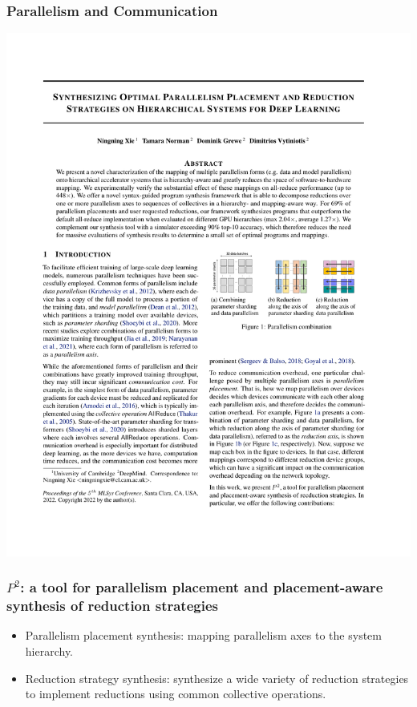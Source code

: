 \documentclass[12pt,aspectratio=169]{beamer}
\begin{document}
    \begin{frame}
        \frametitle{Parallelism and Communication}

        \centering
        \includegraphics[page=2,trim=1.92cm 20cm 2.2cm 2.2cm,clip,scale=0.8]{p2.pdf}
    \end{frame}

    \begin{frame}
        \frametitle{$P^2$: a tool for parallelism placement and placement-aware synthesis of reduction strategies}

        \begin{itemize}
            \setlength{\itemsep}{.8em}
            \item Parallelism placement synthesis: mapping parallelism axes to the system hierarchy.
            \item Reduction strategy synthesis: synthesize a wide variety of reduction strategies to implement reductions using common collective operations.
        \end{itemize}
    \end{frame}
\end{document}
